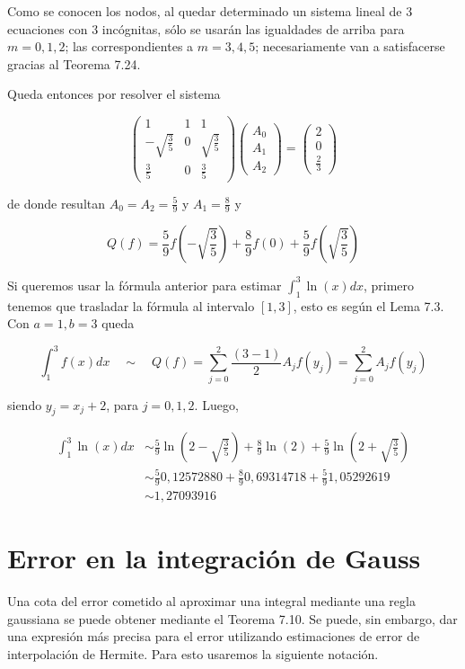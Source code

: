 \documentclass[10pt]{book}
\begin{document}
Como se conocen los nodos, al quedar determinado un sistema lineal de 3 ecuaciones con 3 incógnitas, sólo se usarán las igualdades de arriba para $m=0,1,2$; las correspondientes a $m=3,4,5$; necesariamente van a satisfacerse gracias al Teorema 7.24.

Queda entonces por resolver el sistema

$$
\left(\begin{array}{ccc}
1 & 1 & 1 \\
-\sqrt{\frac{3}{5}} & 0 & \sqrt{\frac{3}{5}} \\
\frac{3}{5} & 0 & \frac{3}{5}
\end{array}\right)\left(\begin{array}{c}
A_{0} \\
A_{1} \\
A_{2}
\end{array}\right)=\left(\begin{array}{c}
2 \\
0 \\
\frac{2}{3}
\end{array}\right)
$$

de donde resultan $A_{0}=A_{2}=\frac{5}{9}$ y $A_{1}=\frac{8}{9}$ y

$$
Q(f)=\frac{5}{9} f\left(-\sqrt{\frac{3}{5}}\right)+\frac{8}{9} f(0)+\frac{5}{9} f\left(\sqrt{\frac{3}{5}}\right)
$$

Si queremos usar la fórmula anterior para estimar $\int_{1}^{3} \ln (x) d x$, primero tenemos que trasladar la fórmula al intervalo $[1,3]$, esto es según el Lema 7.3. Con $a=1, b=3$ queda

$$
\int_{1}^{3} f(x) d x \quad \sim \quad Q(f)=\sum_{j=0}^{2} \frac{(3-1)}{2} A_{j} f\left(y_{j}\right)=\sum_{j=0}^{2} A_{j} f\left(y_{j}\right)
$$

siendo $y_{j}=x_{j}+2$, para $j=0,1,2$. Luego,

$$
\begin{aligned}
\int_{1}^{3} \ln (x) d x & \sim \frac{5}{9} \ln \left(2-\sqrt{\frac{3}{5}}\right)+\frac{8}{9} \ln (2)+\frac{5}{9} \ln \left(2+\sqrt{\frac{3}{5}}\right) \\
& \sim \frac{5}{9} 0,12572880+\frac{8}{9} 0,69314718+\frac{5}{9} 1,05292619 \\
& \sim 1,27093916
\end{aligned}
$$

\section*{Error en la integración de Gauss}
Una cota del error cometido al aproximar una integral mediante una regla gaussiana se puede obtener mediante el Teorema 7.10. Se puede, sin embargo, dar una expresión más precisa para el error utilizando estimaciones de error de interpolación de Hermite. Para esto usaremos la siguiente notación.
\end{document}
